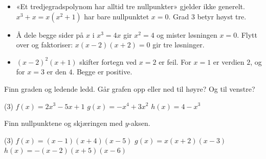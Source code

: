\begin{vanligfeil}
\begin{itemize}[leftmargin=1.2em,itemsep=1pt,topsep=0pt]
  \item «Et tredjegradspolynom har alltid tre nullpunkter» gjelder ikke generelt. $x^3 + x = x(x^2 + 1)$ har bare nullpunktet $x = 0$. Grad 3 betyr høyst tre.
  \item Å dele begge sider på $x$ i $x^3 = 4x$ gir $x^2 = 4$ og mister løsningen $x = 0$. Flytt over og faktoriser: $x(x-2)(x+2) = 0$ gir tre løsninger.
  \item $(x - 2)^2(x + 1)$ skifter fortegn ved $x = 2$ er feil. For $x = 1$ er verdien $2$, og for $x = 3$ er den $4$. Begge er positive.
\end{itemize}
\end{vanligfeil}


Finn graden og ledende ledd. Går grafen opp eller ned til høyre? Og til venstre?
\begin{tasks}(3)
  \task $f(x) = 2x^3 - 5x + 1$
  \task $g(x) = -x^4 + 3x^2$
  \task $h(x) = 4 - x^3$
\end{tasks}

Finn nullpunktene og skjæringen med $y$-aksen.
\begin{tasks}(3)
  \task $f(x) = (x - 1)(x + 4)(x - 5)$
  \task $g(x) = x(x + 2)(x - 3)$
  \task $h(x) = -(x - 2)(x + 5)(x - 6)$
\end{tasks}

